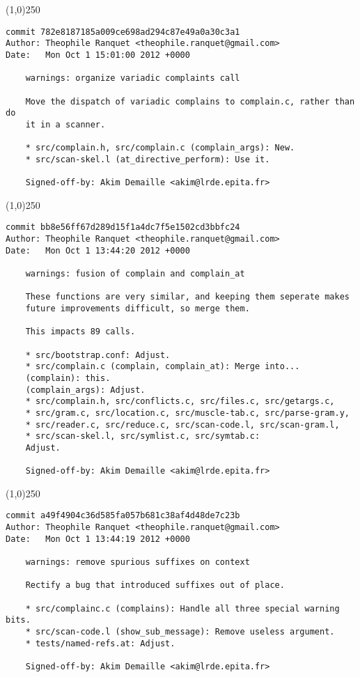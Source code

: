 \line(1,0){250}
\begin{verbatim}
commit 782e8187185a009ce698ad294c87e49a0a30c3a1
Author: Theophile Ranquet <theophile.ranquet@gmail.com>
Date:   Mon Oct 1 15:01:00 2012 +0000

    warnings: organize variadic complaints call
    
    Move the dispatch of variadic complains to complain.c, rather than do
    it in a scanner.
    
    * src/complain.h, src/complain.c (complain_args): New.
    * src/scan-skel.l (at_directive_perform): Use it.
    
    Signed-off-by: Akim Demaille <akim@lrde.epita.fr>

\end{verbatim}
\line(1,0){250}
\begin{verbatim}
commit bb8e56ff67d289d15f1a4dc7f5e1502cd3bbfc24
Author: Theophile Ranquet <theophile.ranquet@gmail.com>
Date:   Mon Oct 1 13:44:20 2012 +0000

    warnings: fusion of complain and complain_at
    
    These functions are very similar, and keeping them seperate makes
    future improvements difficult, so merge them.
    
    This impacts 89 calls.
    
    * src/bootstrap.conf: Adjust.
    * src/complain.c (complain, complain_at): Merge into...
    (complain): this.
    (complain_args): Adjust.
    * src/complain.h, src/conflicts.c, src/files.c, src/getargs.c,
    * src/gram.c, src/location.c, src/muscle-tab.c, src/parse-gram.y,
    * src/reader.c, src/reduce.c, src/scan-code.l, src/scan-gram.l,
    * src/scan-skel.l, src/symlist.c, src/symtab.c:
    Adjust.
    
    Signed-off-by: Akim Demaille <akim@lrde.epita.fr>

\end{verbatim}
\line(1,0){250}
\begin{verbatim}
commit a49f4904c36d585fa057b681c38af4d48de7c23b
Author: Theophile Ranquet <theophile.ranquet@gmail.com>
Date:   Mon Oct 1 13:44:19 2012 +0000

    warnings: remove spurious suffixes on context
    
    Rectify a bug that introduced suffixes out of place.
    
    * src/complainc.c (complains): Handle all three special warning bits.
    * src/scan-code.l (show_sub_message): Remove useless argument.
    * tests/named-refs.at: Adjust.
    
    Signed-off-by: Akim Demaille <akim@lrde.epita.fr>

\end{verbatim}
